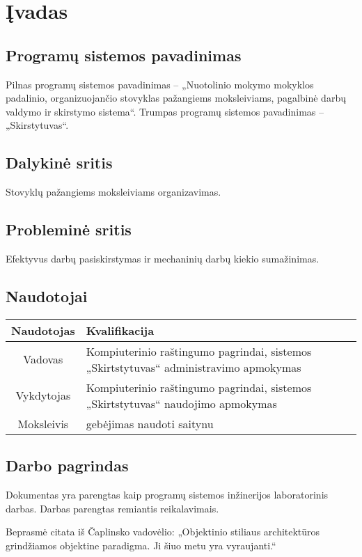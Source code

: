 \chapter{Įvadas}


\section{Programų sistemos pavadinimas}
Pilnas programų sistemos pavadinimas – „Nuotolinio mokymo mokyklos padalinio, 
organizuojančio stovyklas pažangiems moksleiviams, pagalbinė darbų 
valdymo ir skirstymo sistema“.
Trumpas programų sistemos pavadinimas – „Skirstytuvas“.

\section{Dalykinė sritis}
Stovyklų pažangiems moksleiviams organizavimas.

\section{Probleminė sritis}
Efektyvus darbų pasiskirstymas ir mechaninių darbų kiekio sumažinimas.

\section{Naudotojai}
\begin{tabular}{|c|p{7cm}|}
  \hline 
  Naudotojas & Kvalifikacija \\
  \hline
  Vadovas & Kompiuterinio raštingumo pagrindai, sistemos „Skirtstytuvas“ 
  administravimo apmokymas \\
  \hline
  Vykdytojas & Kompiuterinio raštingumo pagrindai, sistemos „Skirtstytuvas“ 
  naudojimo apmokymas \\
  \hline
  Moksleivis & gebėjimas naudoti saitynu \\%
  \hline
\end{tabular}

\section{Darbo pagrindas}
Dokumentas yra parengtas kaip programų sistemos inžinerijos laboratorinis 
darbas. Darbas parengtas remiantis %
reikalavimais.

Beprasmė citata iš Čaplinsko vadovėlio: „Objektinio stiliaus architektūros
grindžiamos objektine paradigma. Ji šiuo metu yra 
vyraujanti.“\cite[50]{cap_psi2}

